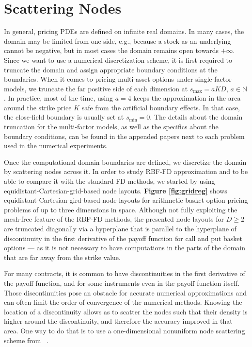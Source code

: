 \documentclass{UUThesisTemplate}
\begin{document}
\section{Scattering Nodes}
In general, pricing PDEs are defined on infinite real domains. In many cases, the domain may be limited from one side, e.g., because a stock as an underlying cannot be negative, but in most cases the domain remains open towards $+\infty$. Since we want to use a numerical discretization scheme, it is first required to truncate the domain and assign appropriate boundary conditions at the boundaries. When it comes to pricing multi-asset options under single-factor models, we truncate the far positive side of each dimension at $s_{\max}=aKD$, $a\in\mathbb{N}$. In practice, most of the time, using $a=4$ keeps the approximation in the area around the strike price $K$ safe from the artificial boundary effects. In that case, the close-field boundary is usually set at $s_{\min}=0$. The details about the domain truncation for the multi-factor models, as well as the specifics about the boundary conditions, can be found in the appended papers next to each problem used in the numerical experiments.
\par Once the computational domain boundaries are defined, we discretize the domain by scattering nodes across it. In order to study RBF-FD approximation and to be able to compare it with the standard FD methods, we started by using equidistant-Cartesian-grid-based node layouts. \textbf{Figure \ref{fig:gridreg}} shows equidistant-Cartesian-gird-based node layouts for arithmetic basket option pricing problems of up to three dimensions in space. Although not fully exploiting the mesh-free feature of the RBF-FD methods, the presented node layouts for $D\geq2$ are truncated diagonally via a hyperplane that is parallel to the hyperplane of discontinuity in the first derivative of the payoff function for call and put basket options --- as it is not necessary to have computations in the parts of the domain that are far away from the strike value.  
\par
For many contracts, it is common to have discontinuities in the first derivative of the payoff function, and for some instruments even in the payoff function itself. Those discontinuities pose an obstacle for accurate numerical approximations and can often limit the order of convergence of the numerical methods. Knowing the location of a discontinuity allows as to scatter the nodes such that their density is higher around the discontinuity, and therefore the accuracy improved in that area. One way to do that is to use a one-dimensional nonuniform node scattering scheme from ~\cite{foulon2010adi}.
\end{document}
